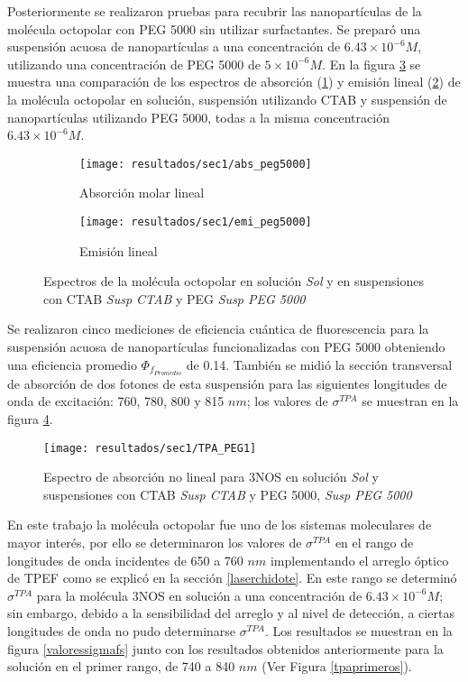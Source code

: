 Posteriormente se realizaron pruebas para recubrir las nanopart\'iculas de la mol\'ecula octopolar con PEG 5000 sin utilizar surfactantes. Se prepar\'o una suspensi\'on acuosa de nanopart\'iculas a una concentraci\'on de $6.43 \times 10^{-6}M$, utilizando una concentraci\'on de PEG 5000 de $5\times 10^{-6} M$. En la figura \ref{grr} se muestra una comparaci\'on de los espectros de absorci\'on (\ref{abspeg1}) y emisi\'on lineal (\ref{emipeg1}) de la mol\'ecula octopolar en soluci\'on, suspensi\'on utilizando CTAB y suspensi\'on de nanopart\'iculas utilizando PEG 5000, todas a la misma concentraci\'on $6.43 \times 10^{-6}M$. 

\begin{figure}
\centering
\begin{subfigure}{0.5\textwidth}
\centering
\texttt{[image: resultados/sec1/abs\_peg5000]}
\caption{Absorci\'on molar lineal }\label{abspeg1}
\end{subfigure}
\begin{subfigure}{0.49\textwidth}
\centering
\texttt{[image: resultados/sec1/emi\_peg5000]}
\caption{Emisi\'on lineal }\label{emipeg1}
\end{subfigure}
\caption{Espectros de la mol\'ecula octopolar en soluci\'on \emph{Sol} y  en suspensiones con CTAB \emph{Susp CTAB} y PEG \emph{Susp PEG 5000}}
\label{grr}
\end{figure}

Se realizaron cinco mediciones de eficiencia cu\'antica de fluorescencia para la suspensi\'on acuosa de nanopart\'iculas funcionalizadas con PEG 5000 obteniendo una eficiencia promedio $\Phi_{f_{Promedio}}$ de 0.14. Tambi\'en se midi\'o la secci\'on transversal de absorci\'on de dos fotones de esta suspensi\'on para las siguientes longitudes de onda de excitaci\'on: 760, 780, 800 y 815 $nm$; los valores de $\sigma^{TPA}$ se muestran en la figura \ref{valoressigmapeg1}.

\begin{figure}[H]
\centering
\texttt{[image: resultados/sec1/TPA\_PEG1]}
\caption{Espectro de absorci\'on no lineal para 3NOS en soluci\'on \emph{Sol} y suspensiones con CTAB \emph{Susp CTAB} y PEG 5000, \emph{Susp PEG 5000}}\label{valoressigmapeg1}
\end{figure}

En este trabajo la mol\'ecula octopolar fue uno de los sistemas moleculares  de mayor inter\'es, por ello se determinaron los valores de $\sigma^{TPA}$ en el rango de longitudes de onda incidentes de 650 a 760 $nm$ implementando el arreglo \'optico de TPEF como se explic\'o en la secci\'on \ref{laserchidote}. En este rango se determin\'o $\sigma^{TPA}$ para la mol\'ecula 3NOS en soluci\'on a una concentraci\'on de $6.43 \times 10^{-6} M$; sin embargo, debido a la sensibilidad del arreglo y al nivel de detecci\'on, a ciertas longitudes de onda no pudo determinarse $\sigma^{TPA}$. Los resultados se muestran en la figura \ref{valoressigmafs} junto con los resultados obtenidos anteriormente para la soluci\'on en el primer rango, de 740 a 840 $nm$ (Ver Figura \ref{tpaprimeros}).

